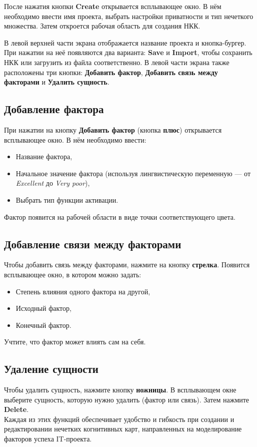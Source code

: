\documentclass{article}
\begin{document}
    После нажатия кнопки \textbf{Create} открывается всплывающее окно. В нём необходимо ввести имя проекта, выбрать настройки приватности и тип нечеткого множества. Затем откроется рабочая область для создания НКК.

    В левой верхней части экрана отображается название проекта и кнопка-бургер. При нажатии на неё появляются два варианта: \textbf{Save} и \textbf{Import}, чтобы сохранить НКК или загрузить из файла соответственно. В левой части экрана также расположены три кнопки: \textbf{Добавить фактор}, \textbf{Добавить связь между факторами} и \textbf{Удалить сущность}.

    \subsection{Добавление фактора}
    При нажатии на кнопку \textbf{Добавить фактор} (кнопка \textbf{плюс}) открывается всплывающее окно. В нём необходимо ввести:
    \begin{itemize}
        \item Название фактора,
        \item Начальное значение фактора (используя лингвистическую переменную — от \textit{Excellent} до \textit{Very poor}),
        \item Выбрать тип функции активации.
    \end{itemize}

    Фактор появится на рабочей области в виде точки соответствующего цвета.

    \subsection{Добавление связи между факторами}
    Чтобы добавить связь между факторами, нажмите на кнопку \textbf{стрелка}. Появится всплывающее окно, в котором можно задать:
    \begin{itemize}
        \item Степень влияния одного фактора на другой,
        \item Исходный фактор,
        \item Конечный фактор.
    \end{itemize}

    Учтите, что фактор может влиять сам на себя.

    \subsection{Удаление сущности}
    Чтобы удалить сущность, нажмите кнопку \textbf{ножницы}. В всплывающем окне выберите сущность, которую нужно удалить (фактор или связь). Затем нажмите \textbf{Delete}.
    ~\\
    Каждая из этих функций обеспечивает удобство и гибкость при создании и редактировании нечетких когнитивных карт, направленных на моделирование факторов успеха IT-проекта.
\end{document}
